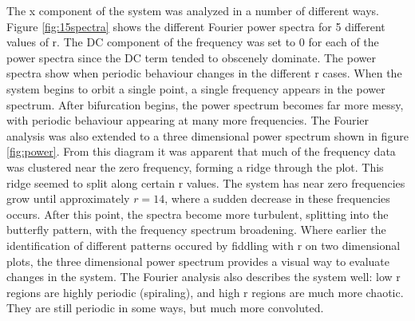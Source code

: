 \documentclass[twocolumn]{article}
\begin{document}
The x component of the system was analyzed in a number of different ways. Figure \ref{fig:15spectra} shows the different Fourier power spectra for 5 different values of r. The DC component of the frequency was set to $0$ for each of the power spectra since the DC term tended to obscenely dominate. The power spectra show when periodic behaviour changes in the different r cases. When the system begins to orbit a single point, a single frequency appears in the power spectrum. After bifurcation begins, the power spectrum becomes far more messy, with periodic behaviour appearing at many more frequencies. The Fourier analysis was also extended to a three dimensional power spectrum shown in figure \ref{fig:power}. From this diagram it was apparent that much of the frequency data was clustered near the zero frequency, forming a ridge through the plot. This ridge seemed to split along certain r values. The system has near zero frequencies grow until approximately $r=14$, where a sudden decrease in these frequencies occurs. After this point, the spectra become more turbulent, splitting into the butterfly pattern, with the frequency spectrum broadening. Where earlier the identification of different patterns occured by fiddling with r on two dimensional plots, the three dimensional power spectrum provides a visual way to evaluate changes in the system. The Fourier analysis also describes the system well: low r regions are highly periodic (spiraling), and high r regions are much more chaotic. They are still periodic in some ways, but much more convoluted.
\end{document}

